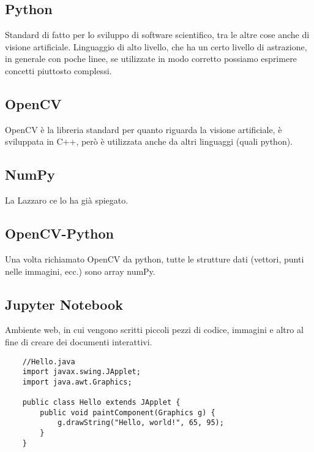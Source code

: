 \subsection{Python}
Standard di fatto per lo sviluppo di software scientifico, tra le altre cose anche di visione artificiale. Linguaggio di alto livello, che ha un certo livello di astrazione, in generale con poche linee, se utilizzate in modo corretto possiamo esprimere concetti piuttosto complessi.

\subsection{OpenCV}
OpenCV è la libreria standard per quanto riguarda la visione artificiale, è sviluppata in C++, però è utilizzata anche da altri linguaggi (quali python).

\subsection{NumPy}
La Lazzaro ce lo ha già spiegato.

\subsection{OpenCV-Python}
Una volta richiamato OpenCV da python, tutte le strutture dati (vettori, punti nelle immagini, ecc.) sono array numPy.

\subsection{Jupyter Notebook}

Ambiente web, in cui vengono scritti piccoli pezzi di codice, immagini e altro al fine di creare dei documenti interattivi.

\begin{lstlisting}
	//Hello.java
	import javax.swing.JApplet;
	import java.awt.Graphics;
	
	public class Hello extends JApplet {
		public void paintComponent(Graphics g) {
			g.drawString("Hello, world!", 65, 95);
		}    
	}
\end{lstlisting}

